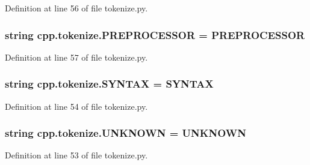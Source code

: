 Definition at line 56 of file tokenize.\+py.

\subsubsection[{\texorpdfstring{P\+R\+E\+P\+R\+O\+C\+E\+S\+S\+OR}{PREPROCESSOR}}]{\setlength{\rightskip}{0pt plus 5cm}string cpp.\+tokenize.\+P\+R\+E\+P\+R\+O\+C\+E\+S\+S\+OR = \textquotesingle{}P\+R\+E\+P\+R\+O\+C\+E\+S\+S\+OR\textquotesingle{}}\hypertarget{namespacecpp_1_1tokenize_a3c8918ee13b9acf5ea4e70b484d67268}{}\label{namespacecpp_1_1tokenize_a3c8918ee13b9acf5ea4e70b484d67268}


Definition at line 57 of file tokenize.\+py.

\subsubsection[{\texorpdfstring{S\+Y\+N\+T\+AX}{SYNTAX}}]{\setlength{\rightskip}{0pt plus 5cm}string cpp.\+tokenize.\+S\+Y\+N\+T\+AX = \textquotesingle{}S\+Y\+N\+T\+AX\textquotesingle{}}\hypertarget{namespacecpp_1_1tokenize_a1655e62b60899059935930c81ba25c01}{}\label{namespacecpp_1_1tokenize_a1655e62b60899059935930c81ba25c01}


Definition at line 54 of file tokenize.\+py.

\subsubsection[{\texorpdfstring{U\+N\+K\+N\+O\+WN}{UNKNOWN}}]{\setlength{\rightskip}{0pt plus 5cm}string cpp.\+tokenize.\+U\+N\+K\+N\+O\+WN = \textquotesingle{}U\+N\+K\+N\+O\+WN\textquotesingle{}}\hypertarget{namespacecpp_1_1tokenize_a0dfd65c08216eed29f74a64b603ac540}{}\label{namespacecpp_1_1tokenize_a0dfd65c08216eed29f74a64b603ac540}


Definition at line 53 of file tokenize.\+py.

